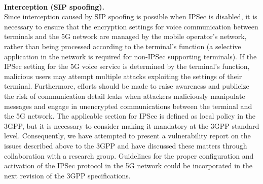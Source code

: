\documentclass[english]{article}
\begin{document}
\\[0.2cm]
\textbf{Interception (SIP spoofing).}\\
Since interception caused by SIP spoofing is possible when IPSec is disabled,
it is necessary to ensure that the encryption settings for voice communication
between terminals and the 5G network are managed by the mobile operator's network,
rather than being processed according to the terminal's function (a selective
application in the network is required for non-IPSec supporting terminals). If
the IPSec setting for the 5G voice service is determined by the terminal's function,
malicious users may attempt multiple attacks exploiting the settings of their terminal.
Furthermore, efforts should be made to raise awareness and publicize the risk of
communication detail leaks when attackers maliciously manipulate messages and engage
in unencrypted communications between the terminal and the 5G network. The applicable
section for IPSec is defined as local policy in the 3GPP, but it is necessary to
consider making it mandatory at the 3GPP standard level. Consequently, we have
attempted to present a vulnerability report on the issues described above to the
3GPP and have discussed these matters through collaboration with a research group.
Guidelines for the proper configuration and activation of the IPSec protocol in the
5G network could be incorporated in the next revision of the 3GPP specifications.
\end{document}
